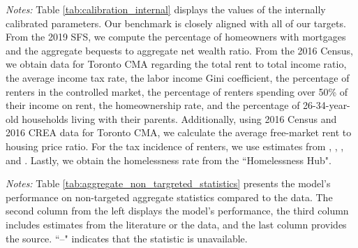 \documentclass[parskip=full]{article}
\newenvironment{fignote2}[1]
{
\par
\medskip
\begin{minipage}{#1}
\footnotesize
}
{
\end{minipage}
}
\begin{document}
\begin{table}[H]
    \centering
    \caption{Internally assigned parameter values}
    \vspace{-1.25cm}
    \label{tab:calibration_internal}
    
    \vspace{-0.5cm}
    \begin{fignote2}{1.08\textwidth}
    \textit{Notes:} Table \ref{tab:calibration_internal} displays the values of the internally calibrated parameters. Our benchmark is closely aligned with all of our targets. From the 2019 SFS, we compute the percentage of homeowners with mortgages and the aggregate bequests to aggregate net wealth ratio. From the 2016 Census, we obtain data for Toronto CMA regarding the total rent to total income ratio, the average income tax rate, the labor income Gini coefficient, the percentage of renters in the controlled market, the percentage of renters spending over 50\% of their income on rent, the homeownership rate, and the percentage of 26-34-year-old households living with their parents. Additionally, using 2016 Census and 2016 CREA data for Toronto CMA, we calculate the average free-market rent to housing price ratio. For the tax incidence of renters, we use estimates from \citet{cy-1994}, \citet{susin-2002}, \citet{fack-2006}, and \citet{sy-2020}. Lastly, we obtain the homelessness rate from the ``Homelessness Hub".
    \end{fignote2}
\end{table}

\begin{table}[H]
    \centering
    \caption{Aggregate non-targeted statistics}
    \vspace{-0.5cm}
    \label{tab:aggregate_non_targreted_statistics}  
    \vspace{-0.45cm}
    \begin{fignote2}{0.9\textwidth}
      \textit{Notes:} Table \ref{tab:aggregate_non_targreted_statistics} presents the model's performance on non-targeted aggregate statistics compared to the data. The second column from the left displays the model's performance, the third column includes estimates from the literature or the data, and the last column provides the source. ``--" indicates that the statistic is unavailable.
    \end{fignote2}
\end{table}
\end{document}
